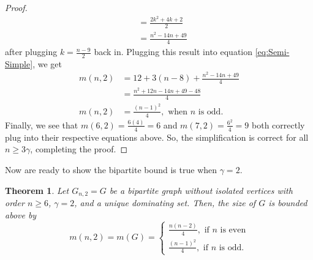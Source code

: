\documentclass[12pt]{amsart}
\newtheorem{thm}{Theorem}
\begin{document}
\begin{proof}
\begin{align*}
     &= \frac{2k^2 + 4k + 2}{2}\\
     &= \frac{n^2 - 14n + 49}{4}
\end{align*}
after plugging $k = \frac{n-9}{2}$ back in. Plugging this result into equation \ref{eq:Semi-Simple}, we get
\begin{align*}
    m(n,2) &= 12 + 3(n-8) + \frac{n^2 - 14n + 49}{4}\\
    &= \frac{n^2 +12n - 14n + 49 - 48}{4}\\
   m(n,2) &= \frac{(n-1)^2}{4}, \text{ when } n \text{ is odd.}
\end{align*}
Finally, we see that $m(6,2) = \frac{6(4)}{4} = 6$ and $m(7,2) = \frac{6^2}{4} = 9$ both correctly plug into their respective equations above. So, the simplification is correct for all $n \geq 3\gamma$, completing the proof.
\end{proof}
Now are ready to show the bipartite bound is true when $\gamma = 2$.
\begin{thm}
    Let $G_{n,2} = G$ be a bipartite graph without isolated vertices with order $n \geq 6$, $\gamma = 2$, and a unique dominating set. Then, the size of $G$ is bounded above by $$m(n,2) = m(G) = \begin{cases}
        \frac{n(n-2)}{4}, \text{     if $n$ is even}\\
        \frac{(n-1)^2}{4},\text{     if $n$ is odd.}
    \end{cases}$$
\end{thm}
\end{document}
